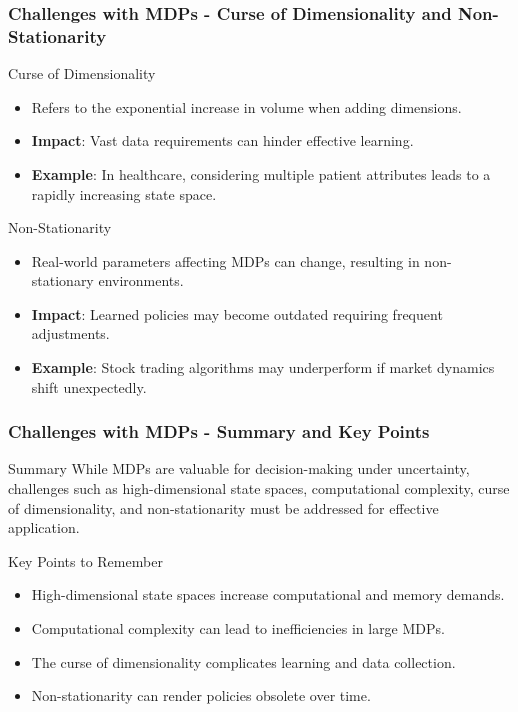 \documentclass[aspectratio=169]{beamer}
\begin{document}
\begin{frame}[fragile]
    \frametitle{Challenges with MDPs - Curse of Dimensionality and Non-Stationarity}
    \begin{block}{Curse of Dimensionality}
        \begin{itemize}
            \item Refers to the exponential increase in volume when adding dimensions.
            \item \textbf{Impact}: Vast data requirements can hinder effective learning.
            \item \textbf{Example}: In healthcare, considering multiple patient attributes leads to a rapidly increasing state space.
        \end{itemize}
    \end{block}
    
    \begin{block}{Non-Stationarity}
        \begin{itemize}
            \item Real-world parameters affecting MDPs can change, resulting in non-stationary environments.
            \item \textbf{Impact}: Learned policies may become outdated requiring frequent adjustments.
            \item \textbf{Example}: Stock trading algorithms may underperform if market dynamics shift unexpectedly.
        \end{itemize}
    \end{block}
\end{frame}

\begin{frame}[fragile]
    \frametitle{Challenges with MDPs - Summary and Key Points}
    \begin{block}{Summary}
        While MDPs are valuable for decision-making under uncertainty, challenges such as high-dimensional state spaces, computational complexity, curse of dimensionality, and non-stationarity must be addressed for effective application.
    \end{block}
    
    \begin{block}{Key Points to Remember}
        \begin{itemize}
            \item High-dimensional state spaces increase computational and memory demands.
            \item Computational complexity can lead to inefficiencies in large MDPs.
            \item The curse of dimensionality complicates learning and data collection.
            \item Non-stationarity can render policies obsolete over time.
        \end{itemize}
    \end{block}
\end{frame}
\end{document}
